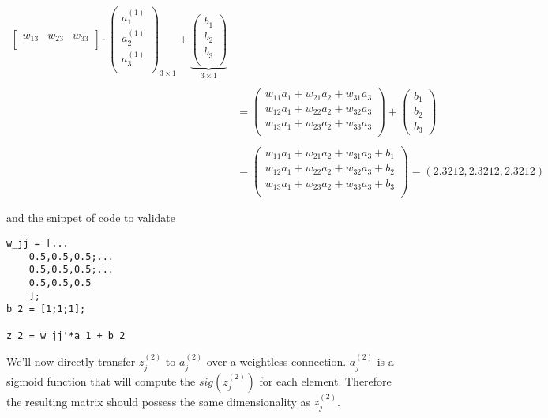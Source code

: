\documentclass{article}
\begin{document}
\begin{align*}
{\begin{bmatrix}
        w_{13} & w_{23} & w_{33} \\
    \end{bmatrix}
    \cdot
    \begin{pmatrix}
        a^{(1)}_1 \\
        a^{(1)}_2 \\
        a^{(1)}_3 \\
    \end{pmatrix}
    }_{3\times 1}
    +
    \underbrace{
    \begin{pmatrix}
        b_1 \\
        b_2 \\
        b_3 \\
    \end{pmatrix}
    }_{3\times 1}\\ \\
    &=
    \begin{pmatrix}
        w_{11}a_1 + w_{21}a_2 + w_{31}a_3 \\
        w_{12}a_1 + w_{22}a_2 + w_{32}a_3 \\
        w_{13}a_1 + w_{23}a_2 + w_{33}a_3 \\
    \end{pmatrix}
    +
    \begin{pmatrix}
        b_1\\
        b_2\\
        b_3
    \end{pmatrix}\\ \\
    &=
    \begin{pmatrix}
        w_{11}a_1 + w_{21}a_2 + w_{31}a_3 + b_1\\
        w_{12}a_1 + w_{22}a_2 + w_{32}a_3 + b_2\\
        w_{13}a_1 + w_{23}a_2 + w_{33}a_3 + b_3\\
    \end{pmatrix}
     = (2.3212,2.3212,2.3212)
\end{align*}

and the snippet of code to validate
\begin{lstlisting}[style=matlab, label=your-label]
w_jj = [...
    0.5,0.5,0.5;...
    0.5,0.5,0.5;...
    0.5,0.5,0.5
    ];
b_2 = [1;1;1];

z_2 = w_jj'*a_1 + b_2 
\end{lstlisting}

We'll now directly transfer $z_j^{(2)}$ to $a_j^{(2)}$ over a weightless connection. $a_j^{(2)}$ is a sigmoid function that will compute the $sig(z_j^{(2)})$ for each element. Therefore the resulting matrix should possess the same dimensionality as $z^{(2)}_j$.
\end{document}
